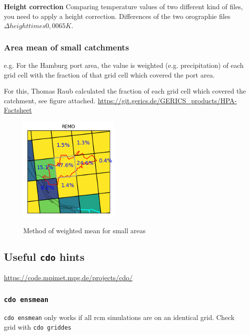 \textbf{Height correction} Comparing temperature values of two different kind of files, you need to apply a height correction. 
Differences of the two orographie files $\Delta height times 0,0065 K$.

\subsubsection{Area mean of small catchments}

e.g. For the Hamburg port area, the value is weighted (e.g. precipitation) of each grid cell with the fraction of that grid cell which covered the port area. 

For this, Thomas Raub calculated the fraction of each grid cell which covered the catchment, see figure attached. 
\url{https://git.gerics.de/GERICS_products/HPA-Factsheet}

\begin{figure} [h!tb]
\begin{center}
\includegraphics[width=5cm, natwidth=200, natheight=195]{./fig/krueckau_weights_REMOdetailliert.png} \\
\caption{Method of weighted mean for small areas}
\end{center}
\end{figure}
\figure

%

\subsection{Useful \texttt{cdo} hints}
\url{https://code.mpimet.mpg.de/projects/cdo/}

\subsubsection{\texttt{cdo ensmean}}
\texttt{cdo ensmean} only works if all rcm simulations are on an identical grid.
Check grid with \texttt{cdo griddes}

